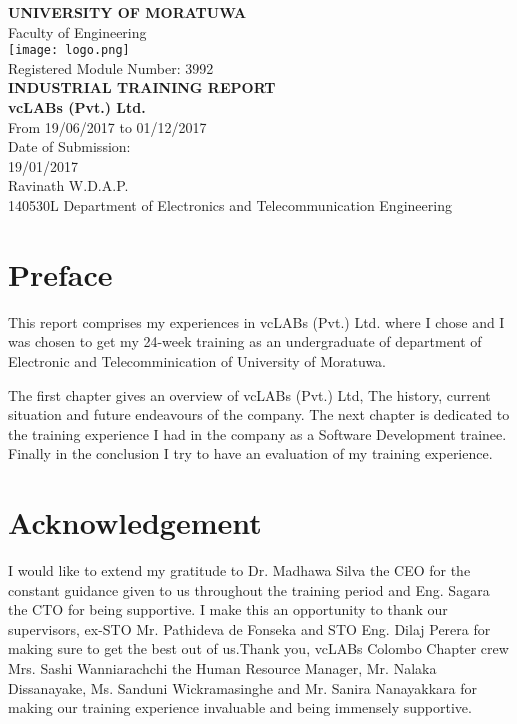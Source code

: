 \documentclass[12pt]{report}
\begin{document}
\begin{titlepage}
    \begin{center}
    	\Large
        \vspace{1cm}
        \textbf{UNIVERSITY OF MORATUWA}\\
        Faculty of Engineering\\
        \vspace{.5cm}
        \texttt{[image: logo.png]}\\
        \vspace{0.5cm}
        Registered Module Number: 3992\\
        \vspace{1cm}
        \textbf{INDUSTRIAL TRAINING REPORT}\\
        \vspace{1cm}
        \textbf{vcLABs (Pvt.) Ltd.}\\
        \vspace{1cm}
        From 19/06/2017 to 01/12/2017\\
        \vspace{.5cm}
        Date of Submission:\\
        19/01/2017\\
        \vspace{.5cm}
        Ravinath W.D.A.P.\\
        140530L Department of Electronics and Telecommunication Engineering
    \end{center}
\end{titlepage}
\renewcommand{\thepage}{\roman{page}}
\chapter*{Preface}
This report comprises my experiences in vcLABs (Pvt.) Ltd. where I chose and I was chosen to get my 24-week training as an undergraduate of department of Electronic and Telecomminication of University of Moratuwa.

The first chapter gives an overview of vcLABs (Pvt.) Ltd, The history, current situation and future endeavours of the company. The next chapter is dedicated to the training experience I had in the company as a Software Development trainee. Finally in the conclusion I try to have an evaluation of my training experience.

\chapter*{Acknowledgement}
I would like to extend my gratitude to Dr. Madhawa Silva the CEO for the constant guidance given to us throughout the training period and Eng. Sagara the CTO for being supportive. I make this an opportunity to thank our supervisors, ex-STO Mr. Pathideva de Fonseka and STO Eng. Dilaj Perera for making sure to get the best out of us.Thank you, vcLABs Colombo Chapter crew Mrs. Sashi Wanniarachchi the Human Resource Manager, Mr. Nalaka Dissanayake, Ms. Sanduni Wickramasinghe and Mr. Sanira Nanayakkara for making our training experience invaluable and being immensely supportive.
\end{document}
